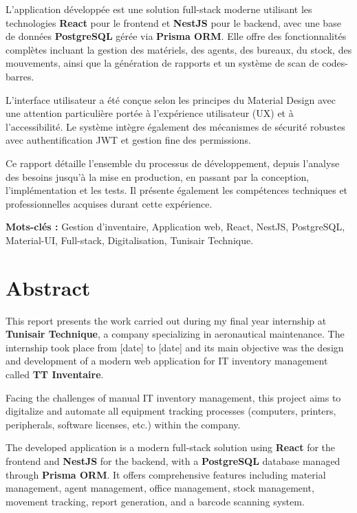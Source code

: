 \documentclass[12pt,a4paper]{report}
\begin{document}
L'application développée est une solution full-stack moderne utilisant les technologies \textbf{React} pour le frontend et \textbf{NestJS} pour le backend, avec une base de données \textbf{PostgreSQL} gérée via \textbf{Prisma ORM}. Elle offre des fonctionnalités complètes incluant la gestion des matériels, des agents, des bureaux, du stock, des mouvements, ainsi que la génération de rapports et un système de scan de codes-barres.

L'interface utilisateur a été conçue selon les principes du Material Design avec une attention particulière portée à l'expérience utilisateur (UX) et à l'accessibilité. Le système intègre également des mécanismes de sécurité robustes avec authentification JWT et gestion fine des permissions.

Ce rapport détaille l'ensemble du processus de développement, depuis l'analyse des besoins jusqu'à la mise en production, en passant par la conception, l'implémentation et les tests. Il présente également les compétences techniques et professionnelles acquises durant cette expérience.

\textbf{Mots-clés :} Gestion d'inventaire, Application web, React, NestJS, PostgreSQL, Material-UI, Full-stack, Digitalisation, Tunisair Technique.

\newpage
\chapter*{Abstract}

This report presents the work carried out during my final year internship at \textbf{Tunisair Technique}, a company specializing in aeronautical maintenance. The internship took place from [date] to [date] and its main objective was the design and development of a modern web application for IT inventory management called \textbf{TT Inventaire}.

Facing the challenges of manual IT inventory management, this project aims to digitalize and automate all equipment tracking processes (computers, printers, peripherals, software licenses, etc.) within the company.

The developed application is a modern full-stack solution using \textbf{React} for the frontend and \textbf{NestJS} for the backend, with a \textbf{PostgreSQL} database managed through \textbf{Prisma ORM}. It offers comprehensive features including material management, agent management, office management, stock management, movement tracking, report generation, and a barcode scanning system.
\end{document}

